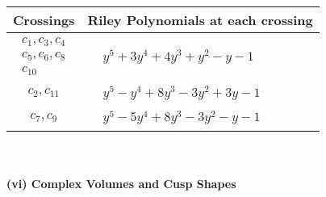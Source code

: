 \documentclass[1p]{elsarticle_modified}
\theoremstyle{definition}
\begin{document}
\begin{tabular}{m{50pt}|m{274pt}}
Crossings & \hspace{64pt}Riley Polynomials at each crossing \\
\hline $$\begin{aligned}c_{1},c_{3},c_{4}\\c_{5},c_{6},c_{8}\\c_{10}\end{aligned}$$&$\begin{aligned}
&y^5+3 y^4+4 y^3+y^2- y-1
\end{aligned}$\\
\hline $$\begin{aligned}c_{2},c_{11}\end{aligned}$$&$\begin{aligned}
&y^5- y^4+8 y^3-3 y^2+3 y-1
\end{aligned}$\\
\hline $$\begin{aligned}c_{7},c_{9}\end{aligned}$$&$\begin{aligned}
&y^5-5 y^4+8 y^3-3 y^2- y-1
\end{aligned}$\\
\hline
\end{tabular}\\~\\
\newpage\flushleft \textbf{(vi) Complex Volumes and Cusp Shapes}
\end{document}
